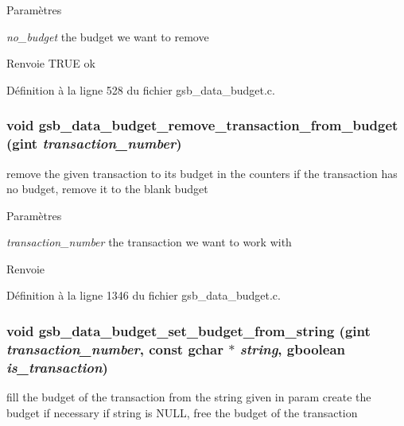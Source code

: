 \begin{DoxyParams}{Paramètres}
\item[{\em no\_\-budget}]the budget we want to remove\end{DoxyParams}
\begin{DoxyReturn}{Renvoie}
TRUE ok 
\end{DoxyReturn}


Définition à la ligne 528 du fichier gsb\_\-data\_\-budget.c.

\subsubsection[{gsb\_\-data\_\-budget\_\-remove\_\-transaction\_\-from\_\-budget}]{\setlength{\rightskip}{0pt plus 5cm}void gsb\_\-data\_\-budget\_\-remove\_\-transaction\_\-from\_\-budget (gint {\em transaction\_\-number})}\label{gsb__data__budget_8h_ab85a062bae73070637c4ff986150de7a}
remove the given transaction to its budget in the counters if the transaction has no budget, remove it to the blank budget


\begin{DoxyParams}{Paramètres}
\item[{\em transaction\_\-number}]the transaction we want to work with\end{DoxyParams}
\begin{DoxyReturn}{Renvoie}

\end{DoxyReturn}


Définition à la ligne 1346 du fichier gsb\_\-data\_\-budget.c.

\subsubsection[{gsb\_\-data\_\-budget\_\-set\_\-budget\_\-from\_\-string}]{\setlength{\rightskip}{0pt plus 5cm}void gsb\_\-data\_\-budget\_\-set\_\-budget\_\-from\_\-string (gint {\em transaction\_\-number}, \/  const gchar $\ast$ {\em string}, \/  gboolean {\em is\_\-transaction})}\label{gsb__data__budget_8h_a431971c9da52046a65f3f00c88d7f58b}
fill the budget of the transaction from the string given in param create the budget if necessary if string is NULL, free the budget of the transaction


